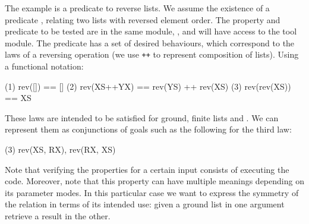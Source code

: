 The example is a predicate to reverse lists.
%
We assume the existence of a predicate , relating two lists
with reversed element order.
%
The property and predicate to be tested are in the same module,
, and will have access to the \plqc{} tool module.
%
The  predicate has a set of desired behaviours, which
correspond to the laws of a reversing operation (we use \texttt{++} to
represent composition of lists).
%
Using a functional notation:
{
\begin{code}
(1)        rev([])     == []
(2)     rev(XS++YX)    == rev(YS) ++ rev(XS)
(3)      rev(rev(XS))  == XS
\end{code}
}
These laws are intended to be satisfied for ground, finite lists
 and .
%
We can represent
 them as conjunctions of \Prolog{} goals such as the following for the
 third law:
%
\begin{yapcode}
  (3)  rev(XS, RX), rev(RX, XS)
\end{yapcode}
%
Note that verifying the properties for a certain input consists of
executing the code. %
%
Moreover, note that this property can have multiple meanings
depending on its parameter modes.
%
In this particular case we want to express the symmetry of the
 relation in terms of its intended use: given a ground
list in one argument retrieve a result in the other.



